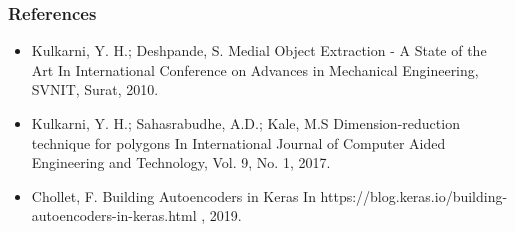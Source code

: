 \begin{frame}\frametitle{References}
\footnotesize
\begin{itemize}
\item Kulkarni, Y. H.; Deshpande, S. Medial Object Extraction - A State of the Art In International Conference on
Advances in Mechanical Engineering, SVNIT, Surat, 2010.
\item Kulkarni, Y. H.; Sahasrabudhe, A.D.; Kale, M.S Dimension-reduction technique for polygons In International
Journal of Computer Aided Engineering and Technology, Vol. 9, No. 1, 2017.
\item Chollet, F. Building Autoencoders in Keras In https://blog.keras.io/building-autoencoders-in-keras.html , 2019.
\end{itemize}
\end{frame}
